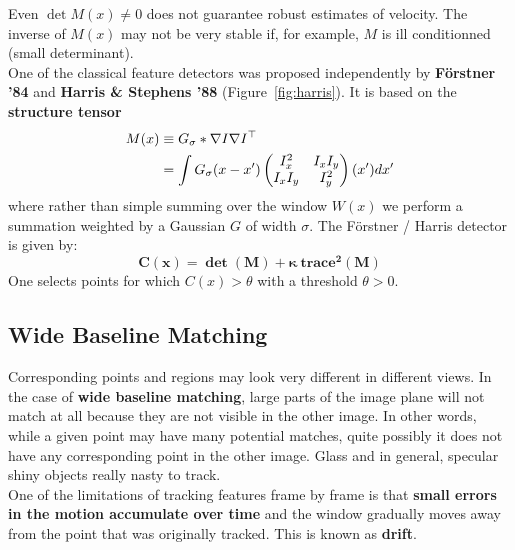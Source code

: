 Even $\det M(x) \neq 0$ does not guarantee robust estimates of velocity.
The inverse of $M(x)$ may not be very stable if, for example,
$M$ is ill conditionned (small determinant).\\

One of the classical feature detectors was proposed independently by
\textbf{F{\"o}rstner '84} and \textbf{Harris \& Stephens '88}
(Figure~\ref{fig:harris}). It is based on the \textbf{structure tensor}
\begin{align*}
	M(x) & \equiv G_{\sigma} * \nabla I \nabla I^{\top} \\
		& = \int G_{\sigma}(x-x') \begin{pmatrix}
			I_x^2 & I_x I_y \\
			I_x I_y & I_y^2 \\
		\end{pmatrix}
		(x') dx'
\end{align*}
where rather than simple summing over the window $W(x)$
we perform a summation weighted by a Gaussian $G$ of width $\sigma$.
The F\"orstner / Harris detector is given by:
\[
	\bm{C(x) = \det(M) + \kappa\ \text{trace}^2(M)}
\]
One selects points for which $C(x)>\theta$ with a threshold $\theta > 0$.


\subsection{Wide Baseline Matching}%
\label{sub:wide_baseline_matching}


Corresponding points and regions may look very different in different views.
In the case of \textbf{wide baseline matching}, large parts of the image
plane will not match at all because they are not visible in the other image.
In other words, while a given point may have many potential matches,
quite possibly it does not have any corresponding point in the other image.
Glass and in general, specular shiny objects really nasty to track.\\

One of the limitations of tracking features frame by frame is that
\textbf{small errors in the motion accumulate over time}
and the window gradually moves away from the point that was originally tracked.
This is known as \textbf{drift}.\\

